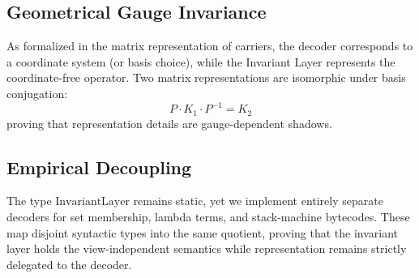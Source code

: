 \subsection{Geometrical Gauge Invariance}
As formalized in the matrix representation of carriers, the decoder corresponds to a coordinate system (or basis choice), while the Invariant Layer represents the coordinate-free operator. Two matrix representations are isomorphic under basis conjugation:
$$P \cdot K_1 \cdot P^{-1} = K_2$$
proving that representation details are gauge-dependent shadows.

\subsection{Empirical Decoupling}
The type $\text{InvariantLayer}$ remains static, yet we implement entirely separate decoders for set membership, lambda terms, and stack-machine bytecodes. These map disjoint syntactic types into the same quotient, proving that the invariant layer holds the view-independent semantics while representation remains strictly delegated to the decoder.
